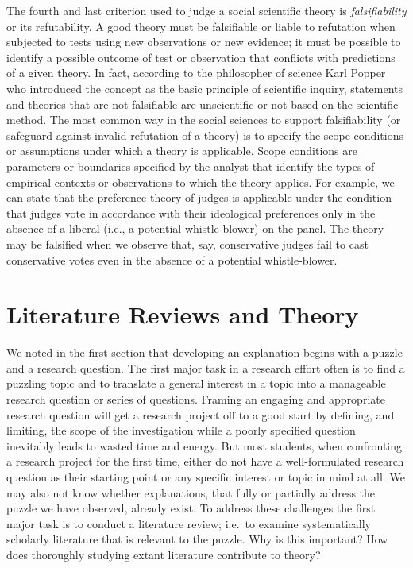 \documentclass{book}
\begin{document}
The fourth and last criterion used to judge a social scientific theory is
\emph{falsifiability} or its refutability. A good theory must be falsifiable
or liable to refutation when subjected to tests using new observations or new
evidence; it must be possible to identify a possible outcome of test or
observation that conflicts with predictions of a given theory. In fact,
according to the philosopher of science Karl Popper who introduced the concept
as the basic principle of scientific inquiry, statements and theories that are
not falsifiable are unscientific or not based on the scientific method. The
most common way in the social sciences to support falsifiability (or safeguard
against invalid refutation of a theory) is to specify the scope conditions or
assumptions under which a theory is applicable. Scope conditions are
parameters or boundaries specified by the analyst that identify the types of
empirical contexts or observations to which the theory applies. For example,
we can state that the preference theory of judges is applicable under the
condition that judges vote in accordance with their ideological preferences
only in the absence of a liberal (i.e., a potential whistle-blower) on the
panel. The theory may be falsified when we observe that, say, conservative
judges fail to cast conservative votes even in the absence of a potential
whistle-blower.

\hypertarget{literature-reviews-and-theory}{%
\section{Literature Reviews and Theory}\label{literature-reviews-and-theory}}

We noted in the first section that developing an explanation begins with a
puzzle and a research question. The first major task in a research effort
often is to find a puzzling topic and to translate a general interest in a
topic into a manageable research question or series of questions. Framing an
engaging and appropriate research question will get a research project off to
a good start by defining, and limiting, the scope of the investigation while a
poorly specified question inevitably leads to wasted time and energy. But most
students, when confronting a research project for the first time, either do
not have a well-formulated research question as their starting point or any
specific interest or topic in mind at all. We may also not know whether
explanations, that fully or partially address the puzzle we have observed,
already exist. To address these challenges the first major task is to conduct
a literature review; i.e.~to examine systematically scholarly literature that
is relevant to the puzzle. Why is this important? How does thoroughly studying
extant literature contribute to theory?
\end{document}
